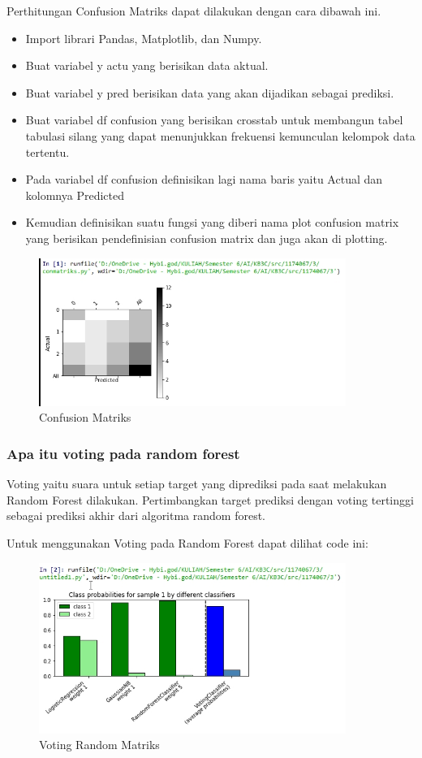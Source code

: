 \hfill\break
Perthitungan Confusion Matriks dapat dilakukan dengan cara dibawah ini.
\begin{itemize}
\item
Import librari Pandas, Matplotlib, dan Numpy.
\item
Buat variabel y actu yang berisikan data aktual.
\item
Buat variabel y pred berisikan data yang akan dijadikan sebagai prediksi.
\item
Buat variabel df confusion yang berisikan crosstab untuk membangun tabel tabulasi silang yang dapat menunjukkan frekuensi kemunculan kelompok data tertentu.
\item
Pada variabel df confusion definisikan lagi nama baris yaitu Actual dan kolomnya Predicted
\item
Kemudian definisikan suatu fungsi yang diberi nama plot confusion matrix yang berisikan pendefinisian confusion matrix dan juga akan di plotting.

\end{itemize}
\begin{figure}[H]
\centerline{\includegraphics[width=10cm]{figures/1174080/3/2.jpg}}
\caption{Confusion Matriks}
\label{labelgambar}
\end{figure}

\subsubsection{Apa itu voting pada random forest}

\hfill\break
Voting yaitu suara untuk setiap target yang diprediksi pada saat melakukan Random Forest dilakukan. Pertimbangkan target prediksi dengan voting tertinggi sebagai prediksi akhir dari algoritma random forest.

Untuk menggunakan Voting pada Random Forest dapat dilihat code ini:

\begin{figure}[H]
\centerline{\includegraphics[width=10cm]{figures/1174080/3/3.jpg}}
\caption{Voting Random Matriks}
\label{labelgambar}
\end{figure}


